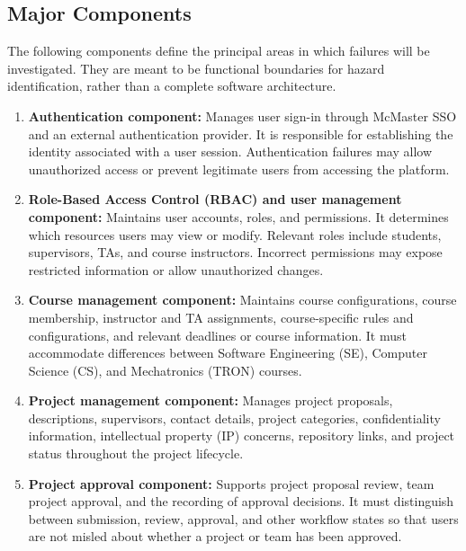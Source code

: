 \documentclass{article}
\begin{document}
\subsection{Major Components}

The following components define the principal areas in which failures will be investigated. They are meant to
be functional boundaries for hazard identification, rather than a complete software architecture.

\begin{enumerate}
    \item \textbf{Authentication component:}
    Manages user sign-in through McMaster SSO and an external authentication provider.
    It is responsible for establishing the identity associated
    with a user session. Authentication failures may allow
    unauthorized access or prevent legitimate users from
    accessing the platform.

    \item \textbf{Role-Based Access Control (RBAC) and
    user management component:}
    Maintains user accounts, roles, and permissions. It determines which resources users may view or modify.
    Relevant roles include students, supervisors, TAs, and course instructors. Incorrect permissions may expose
    restricted information or allow unauthorized changes.

    \item \textbf{Course management component:}
    Maintains course configurations, course membership, instructor and TA assignments, course-specific rules and
    configurations, and relevant deadlines or course information. It must accommodate differences between Software
    Engineering (SE), Computer Science (CS), and Mechatronics (TRON) courses.

    \item \textbf{Project management component:}
    Manages project proposals, descriptions, supervisors, contact details, project categories, confidentiality
    information, intellectual property (IP) concerns, repository links, and project status throughout the
    project lifecycle.

    \item \textbf{Project approval component:}
    Supports project proposal review, team project approval, and the recording of approval decisions. It must
    distinguish between submission, review, approval, and other workflow states so that users are not misled
    about whether a project or team has been approved.


\end{enumerate}
\end{document}
